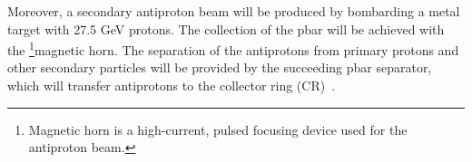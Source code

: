 Moreover, a secondary antiproton beam will be produced by bombarding a metal target with 27.5 GeV protons. The collection of the pbar will be achieved with the \footnote{Magnetic horn is a high-current, pulsed focusing device used for the antiproton beam.}{magnetic horn}. The separation of the antiprotons from primary protons
and other secondary particles will be provided by the succeeding pbar separator, which will transfer antiprotons to the collector ring (CR)~\cite{SI100_CR}.

